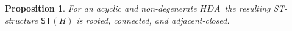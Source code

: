 \documentclass[submission,copyright,creativecommons]{eptcs}
\newtheorem{lemma}[theorem]{Lemma}
\newtheorem{proposition}[theorem]{Proposition}
\newenvironment{proof}[1][\!\!\,]{\vspace{1ex}\noindent\textbf{Proof #1: }}{\hfill$\Box$\vspace{2ex}}
\newcommand{\cp}[1]{}
\newcommand\HDA{\ensuremath{\mathit{HDA}}}
\newcommand\hintost{\ensuremath{\mathsf{ST}}}
\newcommand{\homotopic}[1]{\ensuremath{\stackrel{#1}{\longleftrightarrow}}}
\begin{document}
\cp{
The definition above is based on the following lemma.

\begin{lemma}
Two homotopic paths $\pi\homotopic{hom}\pi'$ are translated in the same ST-configuration:

\centerline{$\hintost(\pi)=\hintost(\pi')$.}
\end{lemma}

\begin{proof}

\end{proof}
}

\begin{proposition}\label{prop_hdaintost}
For an acyclic and non-degenerate \HDA\ the resulting ST-structure $\hintost(H)$ is rooted, connected, and adjacent-closed.
\end{proposition}
\end{document}
